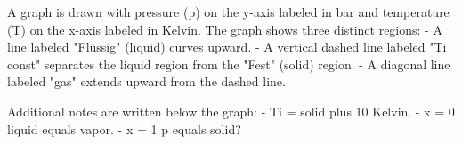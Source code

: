 A graph is drawn with pressure (p) on the y-axis labeled in bar and temperature (T) on the x-axis labeled in Kelvin. The graph shows three distinct regions:  
- A line labeled "Flüssig" (liquid) curves upward.  
- A vertical dashed line labeled "Ti const" separates the liquid region from the "Fest" (solid) region.  
- A diagonal line labeled "gas" extends upward from the dashed line.  

Additional notes are written below the graph:  
- Ti = solid plus 10 Kelvin.  
- x = 0 liquid equals vapor.  
- x = 1 p equals solid?